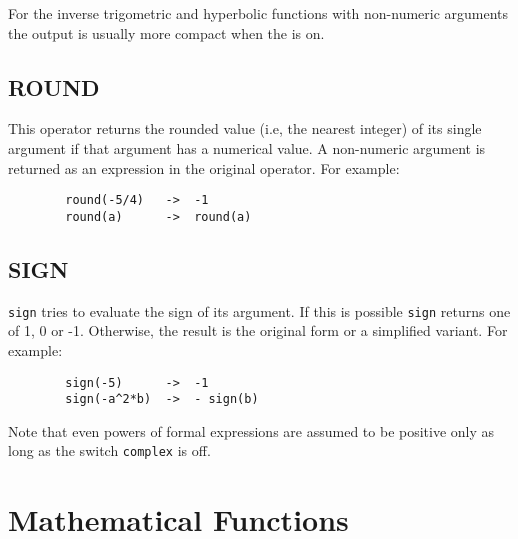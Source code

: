For the inverse trigometric and hyperbolic functions with non-numeric arguments the output is usually more compact when the  is on.

\subsection{ROUND}
\hypertarget{operator:ROUND}{}
This operator returns the rounded value (i.e, the nearest integer) of its
single argument if that argument has a numerical value.  A non-numeric
argument is returned as an expression in the original operator.  For
example:
\begin{verbatim}
        round(-5/4)   ->  -1
        round(a)      ->  round(a)
\end{verbatim}

\subsection{SIGN}
\hypertarget{operator:SIGN}{}
\texttt{sign} tries to evaluate the sign of its argument. If this
is possible \texttt{sign} returns one of 1, 0 or -1.  Otherwise, the result
is the original form or a simplified variant. For example:
\begin{verbatim}
        sign(-5)      ->  -1
        sign(-a^2*b)  ->  - sign(b)
\end{verbatim}
Note that even powers of formal expressions are assumed to be
positive only as long as the switch \texttt{complex} is off.

\section{Mathematical Functions}
\hypertarget{operator:ACOS}{}
\hypertarget{operator:ACOSD}{}
\hypertarget{operator:ACOSH}{}
\hypertarget{operator:ACOT}{}
\hypertarget{operator:ACOTD}{}
\hypertarget{operator:ACOTH}{}
\hypertarget{operator:ACSC}{}
\hypertarget{operator:ACSCD}{}
\hypertarget{operator:ACSCH}{}
\hypertarget{operator:ASEC}{}
\hypertarget{operator:ASECD}{}
\hypertarget{operator:ASECH}{}
\hypertarget{operator:ASIN}{}
\hypertarget{operator:ASIND}{}
\hypertarget{operator:ASINH}{}
\hypertarget{operator:ATAN}{}
\hypertarget{operator:ATAND}{}
\hypertarget{operator:ATANH}{}
\hypertarget{operator:ATAN2}{}
\hypertarget{operator:ATAN2D}{}
\hypertarget{operator:COS}{}
\hypertarget{operator:COSD}{}
\hypertarget{operator:COSH}{}
\hypertarget{operator:COT}{}
\hypertarget{operator:COTD}{}
\hypertarget{operator:COTH}{}
\hypertarget{operator:CSC}{}
\hypertarget{operator:CSCD}{}
\hypertarget{operator:CSCH}{}
\hypertarget{operator:EXP}{}
\hypertarget{operator:HYPOT}{}
\hypertarget{operator:LOG}{}
\hypertarget{operator:LOGB}{}
\hypertarget{operator:LOG10}{}
\hypertarget{operator:SEC}{}
\hypertarget{operator:SECD}{}
\hypertarget{operator:SECH}{}
\hypertarget{operator:SIN}{}
\hypertarget{operator:SIND}{}
\hypertarget{operator:SINH}{}
\hypertarget{operator:SQRT}{}
\hypertarget{operator:TAN}{}
\hypertarget{operator:TAND}{}
\hypertarget{operator:TANH}{}
\hypertarget{operator:NORM}{}
\hypertarget{operator:ARG}{}
\hypertarget{operator:ARGD}{}

